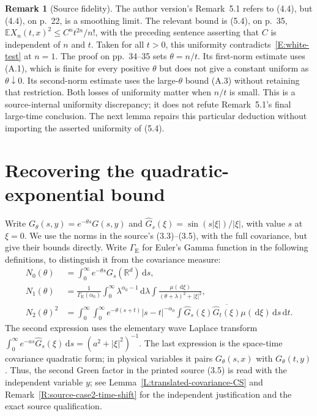 \documentclass[12pt,oneside,openany]{book}
\numberwithin{equation}{section}
\theoremstyle{nogostyle}
\theoremstyle{definition}
\newtheorem{remark}[theorem]{Remark}
\newcommand{\R}{\mathbb{R}}
\newcommand{\E}{\mathbb{E}}
\newcommand{\ud}{\,\mathrm{d}}
\begin{document}
\begin{remark}[Source fidelity]\label{R:source-uniformity}
  The author version's Remark~5.1 refers to (4.4), but (4.4), on p.~22, is a
  smoothing limit. The relevant bound is (5.4), on p.~35, $\E X_n(t,x)^2 \le
  C^nt^{2n}/n!$, with the preceding sentence asserting that $C$ is independent
  of $n$ and $t$. Taken for all $t > 0$, this uniformity
  contradicts~\eqref{E:white-test} at $n = 1$. The proof on pp.~34--35 sets
  $\theta = n/t$. Its first-norm estimate uses (A.1), which is finite for every
  positive $\theta$ but does not give a constant uniform as $\theta\downarrow0$.
  Its second-norm estimate uses the large-$\theta$ bound (A.3) without retaining
  that restriction. Both losses of uniformity matter when $n/t$ is small. This
  is a source-internal uniformity discrepancy; it does not refute Remark~5.1's
  final large-time conclusion. The next lemma repairs this particular deduction
  without importing the asserted uniformity of (5.4).
\end{remark}

\section{Recovering the quadratic-exponential bound}

Write $G_\theta(s,y) = e^{-\theta s}G(s,y)$ and $\widehat{G}_s(\xi) =
\sin(s|\xi|)/|\xi|$, with value $s$ at $\xi = 0$. We use the norms in the
source's (3.3)--(3.5), with the full covariance, but give their bounds directly.
Write $\Gamma_{\mathrm{E}}$ for Euler's Gamma function in the following
definitions, to distinguish it from the covariance measure:
\begin{equation}\label{E:damped-norm-definitions}
  \begin{split}
    N_0(\theta)&=\int_0^\infty e^{-\theta s}G_s(\R^d)\ud s,\\
    N_1(\theta)&=\frac1{\Gamma_{\mathrm{E}}(\alpha_0)}
    \int_0^\infty\lambda^{\alpha_0-1}\ud\lambda
    \int\frac{\mu(\ud\xi)}{(\theta+\lambda)^2+|\xi|^2},\\
    N_2(\theta)^2&=\int_0^\infty\int_0^\infty
    e^{-\theta(s+t)}|s-t|^{-\alpha_0}
    \int\widehat{G}_s(\xi)\overline{\widehat{G}_t(\xi)}
    \mu(\ud\xi)\ud s\ud t.
  \end{split}
\end{equation}
The second expression uses the elementary wave Laplace transform $\int_0^\infty
e^{-as}\widehat{G}_s(\xi)\ud s = (a^2+|\xi|^2)^{-1}$. The last expression is the
space-time covariance quadratic form; in physical variables it pairs
$G_\theta(s,x)$ with $G_\theta(t,y)$. Thus, the second Green factor in the
printed source (3.5) is read with the independent variable $y$; see
Lemma~\ref{L:translated-covariance-CS} and
Remark~\ref{R:source-case2-time-shift} for the independent justification and the
exact source qualification.
\end{document}
